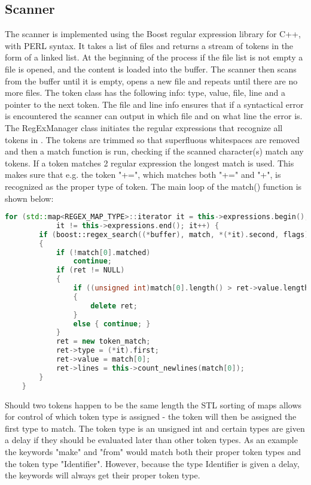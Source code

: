 \subsection{Scanner}
The scanner is implemented using the Boost regular expression library for C++, with PERL syntax. It takes a list of files and returns a stream of tokens in the form of a linked list. At the beginning of the process if the file list is not empty a file is opened, and the content is loaded into the buffer. The scanner then scans from the buffer until it is empty, opens a new file and repeats until there are no more files.
\vspace{10pt}
The token class has the following info: type, value, file, line and a pointer to the next token. The file and line info ensures that if a syntactical error is encountered the scanner can output in which file and on what line the error is. 
\vspace{10pt}
The RegExManager class initiates the regular expressions that recognize all tokens in \langname{}. The tokens are trimmed so that superfluous whitespaces are removed and then a match function is run, checking if the scanned character(s) match any tokens. If a token matches 2 regular expression the longest match is used. This makes sure that e.g. the token "+=", which matches both "+=" and "+", is recognized as the proper type of token. The main loop of the match() function is shown below:

\begin{lstlisting}[language = c++]
	for (std::map<REGEX_MAP_TYPE>::iterator it = this->expressions.begin();
			it != this->expressions.end(); it++) {
		if (boost::regex_search((*buffer), match, *(*it).second, flags))
		{
			if (!match[0].matched)
				continue;
			if (ret != NULL)
			{
				if ((unsigned int)match[0].length() > ret->value.length())
				{
					delete ret;
				}
				else { continue; }
			}
			ret = new token_match;
			ret->type = (*it).first;
			ret->value = match[0];
			ret->lines = this->count_newlines(match[0]);
		}
	}
\end{lstlisting}

Should two tokens happen to be the same length the \ac{STL} sorting of maps allows for control of which token type is assigned - the token will then be assigned the first type to match. The token type is an unsigned int and certain types are given a delay if they should be evaluated later than other token types. As an example the keywords "make" and "from" would match both their proper token types and the token type "Identifier". However, because the type Identifier is given a delay, the keywords will always get their proper token type.

